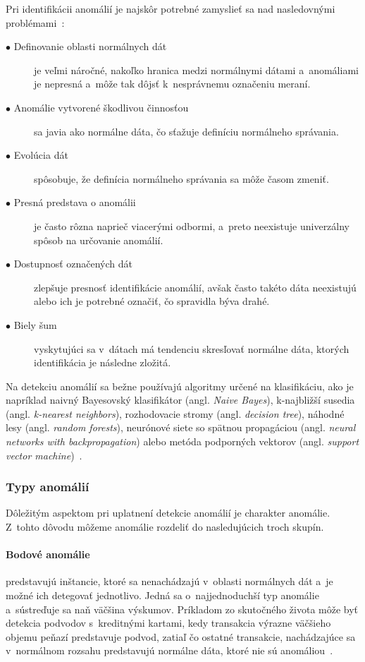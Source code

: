 \documentclass[a4paper,twoside,slovak,12pt,appendix]{article}
\begin{document}
Pri identifikácii anomálií je najskôr potrebné zamyslieť sa nad nasledovnými
problémami~\cite{Chandola2009}:
\begin{description}
	\item[$\bullet$ Definovanie oblasti normálnych dát] je veľmi náročné, nakoľko
	hranica medzi normálnymi dátami a~anomáliami je nepresná a~môže tak dôjsť
	k~nesprávnemu označeniu meraní.
	\item[$\bullet$ Anomálie vytvorené škodlivou činnosťou] sa javia ako normálne
	dáta, čo sťažuje definíciu normálneho správania.
	\item[$\bullet$ Evolúcia dát] spôsobuje, že definícia normálneho správania sa
	môže časom zmeniť.
	\item[$\bullet$ Presná predstava o anomálii] je často rôzna naprieč viacerými
	odbormi, a~preto neexistuje univerzálny spôsob na určovanie anomálií.
	\item[$\bullet$ Dostupnosť označených dát] zlepšuje presnosť identifikácie
	anomálií, avšak často takéto dáta neexistujú alebo ich je potrebné označiť,
	čo spravidla býva drahé.
	\item[$\bullet$ Biely šum] vyskytujúci sa v~dátach má tendenciu skresľovať
	normálne dáta, ktorých identifikácia je následne zložitá.
\end{description}

\noindent
Na detekciu anomálií sa bežne používajú algoritmy určené na klasifikáciu, ako je
napríklad naivný Bayesovský klasifikátor (angl. \textit{Naive Bayes}),
k-najbližší susedia (angl. \textit{k-nearest neighbors}), rozhodovacie stromy
(angl. \textit{decision tree}), náhodné lesy (angl. \textit{random forests}),
neurónové siete so spätnou propagáciou (angl. \textit{neural networks with
backpropagation}) alebo metóda podporných vektorov (angl. \textit{support vector
machine})~\cite{Coma-Puig2016}.


\subsubsection{Typy anomálií}
Dôležitým aspektom pri uplatnení detekcie anomálií je charakter anomálie.
Z~tohto dôvodu môžeme anomálie rozdeliť do nasledujúcich troch skupín.

\paragraph{Bodové anomálie} predstavujú inštancie, ktoré sa nenachádzajú
v~oblasti normálnych dát a~je možné ich detegovať jednotlivo. Jedná sa
o~najjednoduchší typ anomálie a~sústreďuje sa naň väčšina výskumov. Príkladom zo
skutočného života môže byť detekcia podvodov s~kreditnými kartami, kedy
transakcia výrazne väčšieho objemu peňazí predstavuje podvod, zatiaľ čo ostatné
transakcie, nachádzajúce sa v~normálnom rozsahu predstavujú normálne dáta, ktoré
nie sú anomáliou~\cite{Chandola2009}.
\end{document}
